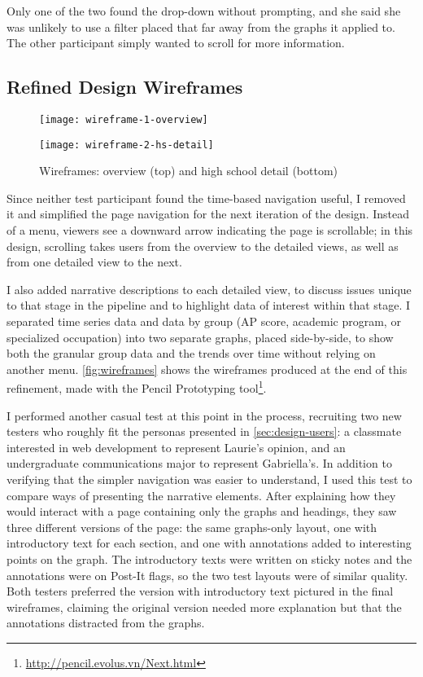 Only one of the two found the drop-down without prompting, and she said she was unlikely to use a filter placed that far away from the graphs it applied to. The other participant simply wanted to scroll for more information.

\subsection{Refined Design Wireframes}\label{sec:dev-wireframes}
\begin{figure}
  \texttt{[image: wireframe-1-overview]}

  \vspace{2cm}

  \texttt{[image: wireframe-2-hs-detail]}
  \caption{Wireframes: overview (top) and high school detail (bottom)}\label{fig:wireframes}
\end{figure}

Since neither test participant found the time-based navigation useful, I removed it and simplified the page navigation for the next iteration of the design. Instead of a menu, viewers see a downward arrow indicating the page is scrollable; in this design, scrolling takes users from the overview to the detailed views, as well as from one detailed view to the next.

I also added narrative descriptions to each detailed view, to discuss issues unique to that stage in the pipeline and to highlight data of interest within that stage. I separated time series data and data by group (AP score, academic program, or specialized occupation) into two separate graphs, placed side-by-side, to show both the granular group data and the trends over time without relying on another menu. \autoref{fig:wireframes} shows the wireframes produced at the end of this refinement, made with the Pencil Prototyping tool\footnote{\url{http://pencil.evolus.vn/Next.html}}.

I performed another casual test at this point in the process, recruiting two new testers who roughly fit the personas presented in \autoref{sec:design-users}: a classmate interested in web development to represent Laurie's opinion, and an undergraduate communications major to represent Gabriella's. In addition to verifying that the simpler navigation was easier to understand, I used this test to compare ways of presenting the narrative elements. After explaining how they would interact with a page containing only the graphs and headings, they saw three different versions of the page: the same graphs-only layout, one with introductory text for each section, and one with annotations added to interesting points on the graph. The introductory texts were written on sticky notes and the annotations were on Post-It flags, so the two test layouts were of similar quality. Both testers preferred the version with introductory text pictured in the final wireframes, claiming the original version needed more explanation but that the annotations distracted from the graphs.


